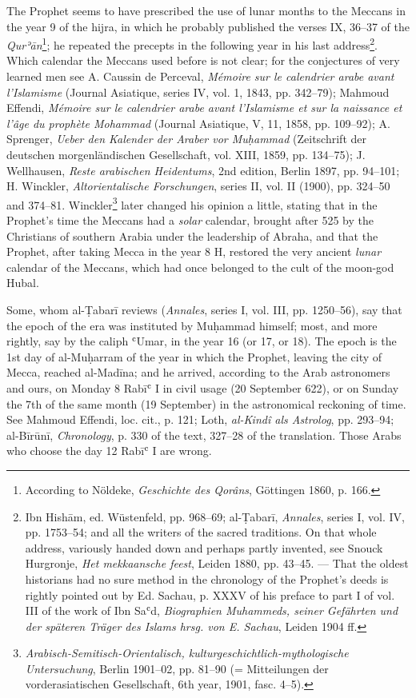 \documentclass[11pt]{article}
\begin{document}
\par The Prophet seems to have prescribed the use of lunar months to the Meccans in the year 9 of the hijra, in which he probably published the verses IX, 36–37 of the \emph{Qurʾān}\footnote{According to Nöldeke, \emph{Geschichte des Qorâns}, Göttingen 1860, p. 166.}; he repeated the precepts in the following year in his last address\footnote{Ibn Hishām, ed. Wüstenfeld, pp. 968–69; al-Ṭabarī, \emph{Annales}, series I, vol. IV, pp. 1753–54; and all the writers of the sacred traditions. On that whole address, variously handed down and perhaps partly invented, see Snouck Hurgronje, \emph{Het mekkaansche feest}, Leiden 1880, pp. 43–45. — That the oldest historians had no sure method in the chronology of the Prophet's deeds is rightly pointed out by Ed. Sachau, p. XXXV of his preface to part I of vol. III of the work of Ibn Saʿd, \emph{Biographien Muhammeds, seiner Gefährten und der späteren Träger des Islams hrsg. von E. Sachau}, Leiden 1904 ff.}. Which calendar the Meccans used before is not clear; for the conjectures of very learned men see A. Caussin de Perceval, \emph{Mémoire sur le calendrier arabe avant l'Islamisme} (Journal Asiatique, series IV, vol. 1, 1843, pp. 342–79); Mahmoud Effendi, \emph{Mémoire sur le calendrier arabe avant l'Islamisme et sur la naissance et l'âge du prophète Mohammad} (Journal Asiatique, V, 11, 1858, pp. 109–92); A. Sprenger, \emph{Ueber den Kalender der Araber vor Muḥammad} (Zeitschrift der deutschen morgenländischen Gesellschaft, vol. XIII, 1859, pp. 134–75); J. Wellhausen, \emph{Reste arabischen Heidentums}, 2nd edition, Berlin 1897, pp. 94–101; H. Winckler, \emph{Altorientalische Forschungen}, series II, vol. II (1900), pp. 324–50 and 374–81. Winckler\footnote{\emph{Arabisch-Semitisch-Orientalisch, kulturgeschichtlich-mythologische Untersuchung}, Berlin 1901–02, pp. 81–90 (= Mitteilungen der vorderasiatischen Gesellschaft, 6th year, 1901, fasc. 4–5).} later changed his opinion a little, stating that in the Prophet's time the Meccans had a \emph{solar} calendar, brought after 525 by the Christians of southern Arabia under the leadership of Abraha, and that the Prophet, after taking Mecca in the year 8 H, restored the very ancient \emph{lunar} calendar of the Meccans, which had once belonged to the cult of the moon-god Hubal.\par
\par Some, whom al-Ṭabarī reviews (\emph{Annales}, series I, vol. III, pp. 1250–56), say that the epoch of the era was instituted by Muḥammad himself; most, and more rightly, say by the caliph ʿUmar, in the year 16 (or 17, or 18). The epoch is the 1st day of al-Muḥarram of the year in which the Prophet, leaving the city of Mecca, reached al-Madīna; and he arrived, according to the Arab astronomers and ours, on Monday 8 Rabīʿ I in civil usage (20 September 622), or on Sunday the 7th of the same month (19 September) in the astronomical reckoning of time. See Mahmoud Effendi, loc. cit., p. 121; Loth, \emph{al-Kindî als Astrolog}, pp. 293–94; al-Bīrūnī, \emph{Chronology}, p. 330 of the text, 327–28 of the translation. Those Arabs who choose the day 12 Rabīʿ I are wrong.\par
\end{document}
